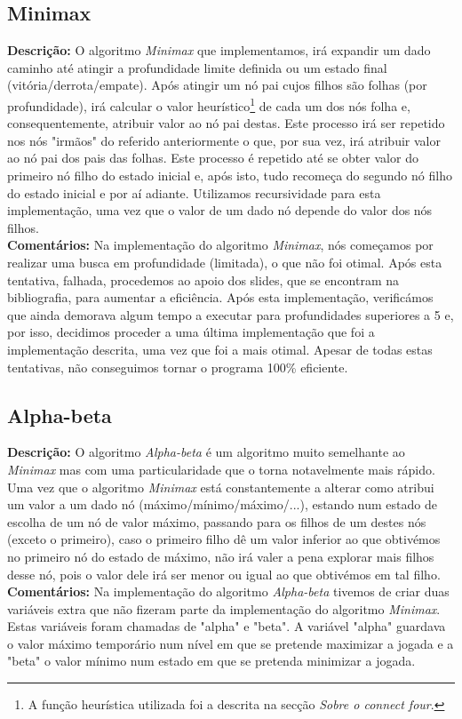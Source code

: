 \documentclass{article}
\begin{document}
\subsection{Minimax}
\textbf{Descrição: }O algoritmo \textit{Minimax} que implementamos, irá expandir um dado caminho até atingir a profundidade limite definida ou um estado final (vitória/derrota/empate). Após atingir um nó pai cujos filhos são folhas (por profundidade), irá calcular o valor heurístico\footnote[1]{A função heurística utilizada foi a descrita na secção \textit{Sobre o connect four}.} de cada um dos nós folha e, consequentemente, atribuir valor ao nó pai destas. Este processo irá ser repetido nos nós "irmãos" do referido anteriormente o que, por sua vez, irá atribuir valor ao nó pai dos pais das folhas. Este processo é repetido até se obter valor do primeiro nó filho do estado inicial e, após isto, tudo recomeça do segundo nó filho do estado inicial e por aí adiante. Utilizamos recursividade para esta implementação, uma vez que o valor de um dado nó depende do valor dos nós filhos.\\[4mm]
\textbf{Comentários: }Na implementação do algoritmo \textit{Minimax}, nós começamos por realizar uma busca em profundidade (limitada), o que não foi otimal. Após esta tentativa, falhada, procedemos ao apoio dos slides, que se encontram na bibliografia, para aumentar a eficiência. Após esta implementação, verificámos que ainda demorava algum tempo a executar para profundidades superiores a 5 e, por isso, decidimos proceder a uma última implementação que foi a implementação descrita, uma vez que foi a mais otimal. Apesar de todas estas tentativas, não conseguimos tornar o programa 100\% eficiente.
\subsection{Alpha-beta}
\textbf{Descrição: }O algoritmo \textit{Alpha-beta} é um algoritmo muito semelhante ao \textit{Minimax} mas com uma particularidade que o torna notavelmente mais rápido. Uma vez que o algoritmo \textit{Minimax} está constantemente a alterar como atribui um valor a um dado nó (máximo/mínimo/máximo/...), estando num estado de escolha de um nó de valor máximo, passando para os filhos de um destes nós (exceto o primeiro), caso o primeiro filho dê um valor inferior ao que obtivémos no primeiro nó do estado de máximo, não irá valer a pena explorar mais filhos desse nó, pois o valor dele irá ser menor ou igual ao que obtivémos em tal filho.\\[4mm]
\textbf{Comentários: }Na implementação do algoritmo \textit{Alpha-beta} tivemos de criar duas variáveis extra que não fizeram parte da implementação do algoritmo \textit{Minimax}. Estas variáveis foram chamadas de "alpha" e "beta". A variável "alpha" guardava o valor máximo temporário num nível em que se pretende maximizar a jogada e a "beta" o valor mínimo num estado em que se pretenda minimizar a jogada.
\end{document}
